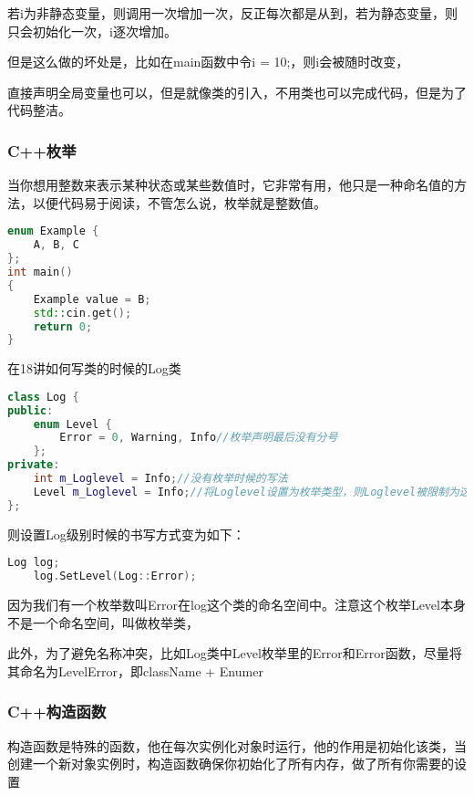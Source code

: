 若{\ncodestyle i}为非静态变量，则调用一次增加一次，反正每次都是从{}到{}，若为静态变量，则只会初始化一次，{\ncodestyle i}逐次增加。

但是这么做的坏处是，比如在main函数中令{\ncodestyle i = 10;}，则{\ncodestyle i}会被随时改变，

直接声明全局变量也可以，但是就像类的引入，不用类也可以完成代码，但是为了代码整洁。


\subsubsection{C++枚举}


当你想用整数来表示某种状态或某些数值时，它非常有用，他只是一种命名值的方法，以便代码易于阅读，不管怎么说，枚举就是整数值。


\begin{lstlisting}[language=c++]
enum Example {
    A, B, C
};
int main()
{
    Example value = B;
    std::cin.get();
    return 0;
}
\end{lstlisting}


在18讲如何写类的时候的Log类

\begin{lstlisting}[language=c++]
class Log {
public:
    enum Level {
        Error = 0, Warning, Info//枚举声明最后没有分号
    };
private:
    int m_Loglevel = Info;//没有枚举时候的写法
    Level m_Loglevel = Info;//将Loglevel设置为枚举类型，则Loglevel被限制为这三个了
};
\end{lstlisting}

则设置Log级别时候的书写方式变为如下：

\begin{lstlisting}[language=c++]
    Log log;
    log.SetLevel(Log::Error);
\end{lstlisting}

因为我们有一个枚举数叫Error在log这个类的命名空间中。注意这个枚举Level本身不是一个命名空间，叫做枚举类，

此外，为了避免名称冲突，比如Log类中Level枚举里的Error和Error函数，尽量将其命名为{\ncodestyle LevelError}，即{\ncodestyle className + Enumer}

\subsubsection{C++构造函数}

构造函数是特殊的函数，他在每次实例化对象时运行，他的作用是初始化该类，当创建一个新对象实例时，构造函数确保你初始化了所有内存，做了所有你需要的设置

